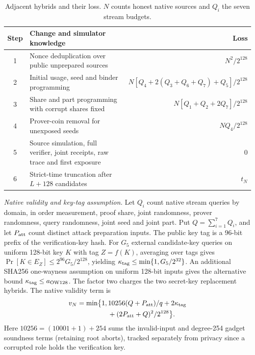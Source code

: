 \documentclass[conference,compsoc]{IEEEtran}
\theoremstyle{definition}
\numberwithin{equation}{section}
\numberwithin{table}{section}
\numberwithin{figure}{section}
\theoremstyle{plain}
\begin{document}
\begin{table}[t]
\centering
\caption{Adjacent hybrids and their loss. \(N\) counts honest native sources
and \(Q_i\) the seven stream budgets.}
\label{tab:hybrid-ledger}
\footnotesize
\renewcommand{\arraystretch}{0.96}
\begin{tabularx}{\textwidth}{@{}cYr@{}}
\toprule
\textbf{Step} & \textbf{Change and simulator knowledge} & \textbf{Loss} \\
 & Nonce deduplication over public unprepared sources & \(N^2/2^{128}\) \\
2 & Initial usage, seed and binder programming & \(N[Q_4+2(Q_3+Q_6+Q_7)+Q_5]/2^{128}\) \\
3 & Share and part programming with corrupt shares fixed & \(N[Q_1+Q_2+2Q_7]/2^{128}\) \\
4 & Prover-coin removal for unexposed seeds & \(NQ_4/2^{128}\) \\
5 & Source simulation, full verifier, joint receipts, raw trace and first exposure & \(0\) \\
6 & Strict-time truncation after \(L+128\) candidates & \(t_N\) \\
\bottomrule
\end{tabularx}
\end{table}

\par\noindent\emph{Native validity and key-tag assumption.}
Let \(Q_i\) count native stream queries by domain, in order measurement,
proof share, joint randomness, prover randomness, query randomness, joint
seed and joint part. Put \(Q=\sum_{i=1}^{7}Q_i\), and let \(P_{\rm att}\)
count distinct attack preparation inputs. The public key tag is a 96-bit prefix of the verification-key hash. For \(G_5\) external candidate-key queries on uniform 128-bit key \(K\) with tag \(Z=f(K)\), averaging over tags gives \(\Pr[K\in E_Z]\le 2^{96}G_5/2^{128}\), yielding \(\kappa_{\rm tag}\le\min\{1,G_5/2^{32}\}\). An additional SHA256 one-wayness assumption on uniform 128-bit inputs gives the alternative bound \(\kappa_{\rm tag}\le a_{\rm OW128}\). The factor two charges the two secret-key replacement hybrids.
The native validity term is
\begin{equation}
 \begin{split}
  v_N=\min\bigl\{1,{}&10256(Q+P_{\rm att})/q+2\kappa_{\rm tag}\\
                     &+(2P_{\rm att}+Q)^2/2^{128}\bigr\}.
 \end{split}
 \label{eq:native-validity-bound}
\end{equation}
Here \(10256=(10001+1)+254\) sums the invalid-input and degree-254 gadget soundness terms (retaining root aborts), tracked separately from privacy since a corrupted role holds the verification key.
\end{document}

